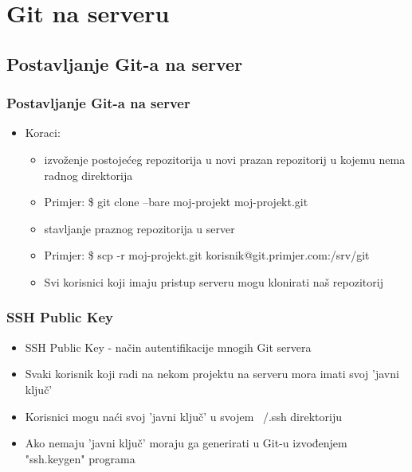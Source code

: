 
\section{Git na serveru}

\subsection {Postavljanje Git-a na server}

\begin{frame}

\frametitle{Postavljanje Git-a na server}

\begin{itemize}

	\item Koraci:

	\begin{itemize}

		\item izvoženje postojećeg repozitorija u novi prazan repozitorij u kojemu nema radnog direktorija

		\item Primjer: \$ git clone --bare moj-projekt moj-projekt.git

		\item stavljanje praznog repozitorija u server

		\item Primjer: \$ scp -r moj-projekt.git korisnik@git.primjer.com:/srv/git

		\item Svi korisnici koji imaju pristup serveru mogu klonirati naš repozitorij

	\end{itemize}

\end{itemize}

\end{frame}



\begin{frame}

\frametitle{SSH Public Key}

\begin{itemize}

	\item SSH Public Key - način autentifikacije mnogih Git servera

	\item Svaki korisnik koji radi na nekom projektu na serveru mora imati svoj 'javni ključ'

	\item Korisnici mogu naći svoj 'javni ključ' u svojem ~/.ssh direktoriju

	\item Ako nemaju 'javni ključ' moraju ga generirati u Git-u izvođenjem "ssh.keygen" programa

\end{itemize}

\end{frame}